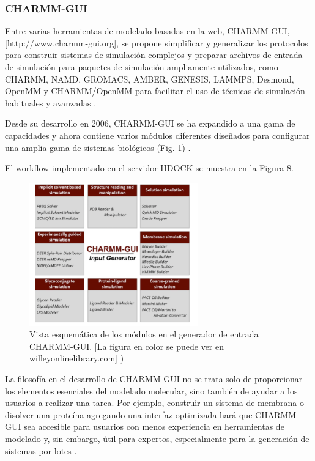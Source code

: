\documentclass[11pt, letterpaper, spanish]{article}
\begin{document}
{{\subsubsection{CHARMM-GUI}
\par{Entre varias herramientas de modelado basadas en la web, CHARMM-GUI, [http://www.charmm-gui.org], se propone simplificar y generalizar los protocolos para construir sistemas de simulación complejos y preparar archivos de entrada de simulación para paquetes de simulación ampliamente utilizados, como CHARMM, NAMD, GROMACS, AMBER, GENESIS, LAMMPS, Desmond, OpenMM y CHARMM/OpenMM para facilitar el uso de técnicas de simulación habituales y avanzadas \cite{Jo_2017}.}
\par{Desde su desarrollo en 2006, CHARMM-GUI se ha expandido a una gama de capacidades y ahora contiene varios módulos diferentes diseñados para configurar una amplia gama de sistemas biológicos (Fig. 1) \cite{Jo_2017}}.

\par El workflow implementado en el servidor HDOCK se muestra en la Figura 8.
        \begin{figure}
	    \centering
		\caption{Vista esquemática de los módulos en el generador de entrada CHARMM-GUI. [La figura en color se puede ver en willeyonlinelibrary.com]\cite{Jo_2017} )}
		\includegraphics[width=0.65\textwidth]{images/Imagen 1.png}
	\end{figure}\textbf{}

    \par{La filosofía en el desarrollo de CHARMM-GUI no se trata solo de proporcionar los elementos esenciales del modelado molecular, sino también de ayudar a los usuarios a realizar una tarea. Por ejemplo, construir un sistema de membrana o disolver una proteína agregando una interfaz optimizada hará que CHARMM-GUI sea accesible para usuarios con menos experiencia en herramientas de modelado y, sin embargo, útil para expertos, especialmente para la generación de sistemas por lotes \cite{Jo_2017}.}

}}
\end{document}
